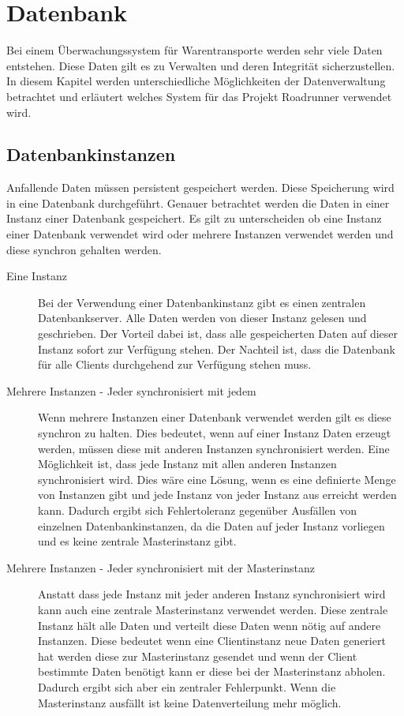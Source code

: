 ﻿\section{Datenbank}

Bei einem Überwachungssystem für Warentransporte werden sehr viele Daten entstehen. Diese Daten gilt es zu Verwalten und deren Integrität sicherzustellen. In diesem Kapitel werden unterschiedliche Möglichkeiten der Datenverwaltung betrachtet und erläutert welches System für das Projekt Roadrunner verwendet wird.

\subsection{Datenbankinstanzen}

Anfallende Daten müssen persistent gespeichert werden. Diese Speicherung wird in eine Datenbank durchgeführt. Genauer betrachtet werden die Daten in einer Instanz einer Datenbank gespeichert. Es gilt zu unterscheiden ob eine Instanz einer Datenbank verwendet wird oder mehrere Instanzen verwendet werden und diese synchron gehalten werden.

\begin{description}
	\item[Eine Instanz] Bei der Verwendung einer Datenbankinstanz gibt es einen zentralen Datenbankserver. Alle Daten werden von dieser Instanz gelesen und geschrieben. Der Vorteil dabei ist, dass alle gespeicherten Daten auf dieser Instanz sofort zur Verfügung stehen. Der Nachteil ist, dass die Datenbank für alle Clients durchgehend zur Verfügung stehen muss.
	\item[Mehrere Instanzen - Jeder synchronisiert mit jedem] Wenn mehrere Instanzen einer Datenbank verwendet werden gilt es diese synchron zu halten. Dies bedeutet, wenn auf einer Instanz Daten erzeugt werden, müssen diese mit anderen Instanzen synchronisiert werden. Eine Möglichkeit ist, dass jede Instanz mit allen anderen Instanzen synchronisiert wird. Dies wäre eine Lösung, wenn es eine definierte Menge von Instanzen gibt und jede Instanz von jeder Instanz aus erreicht werden kann. Dadurch ergibt sich Fehlertoleranz gegenüber Ausfällen von einzelnen Datenbankinstanzen, da die Daten auf jeder Instanz vorliegen und es keine zentrale Masterinstanz gibt.
	\item [Mehrere Instanzen - Jeder synchronisiert mit der Masterinstanz] Anstatt dass jede Instanz mit jeder anderen Instanz synchronisiert wird kann auch eine zentrale Masterinstanz verwendet werden. Diese zentrale Instanz hält alle Daten und verteilt diese Daten wenn nötig auf andere Instanzen. Diese bedeutet wenn eine Clientinstanz neue Daten generiert hat werden diese zur Masterinstanz gesendet und wenn der Client bestimmte Daten benötigt kann er diese bei der Masterinstanz abholen. Dadurch ergibt sich aber ein zentraler Fehlerpunkt. Wenn die Masterinstanz ausfällt ist keine Datenverteilung mehr möglich. 
\end{description}

